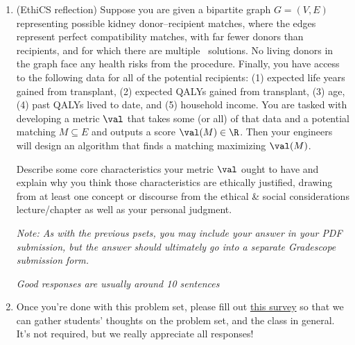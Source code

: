 \documentclass[11pt]{article}
\begin{document}
\begin{enumerate}
 \item (EthiCS reflection) Suppose you are given a bipartite graph $G=(V,E)$ representing possible kidney donor--recipient matches, where the edges represent perfect compatibility matches, with far fewer donors than recipients, and for which there are multiple \MaximumMatching\ solutions. No living donors in the graph face any health risks from the procedure. Finally, you have access to the following data for all of the potential recipients: (1) expected life years gained from transplant, (2) expected QALYs gained from transplant, (3) age, (4) past QALYs lived to date, and (5) household income. You are tasked with developing a metric $\val$ that takes some (or all) of that data
 and a potential matching $M\subseteq E$ and outputs a score $\val(M)\in \R$.
 Then your engineers will design an algorithm that finds a matching maximizing $\val(M)$.

 Describe some core characteristics your metric $\val$ ought to have and explain why you think those characteristics are ethically justified, drawing from at least one concept or discourse from the ethical \& social considerations lecture/chapter as well as your personal judgment.

 \textit{Note: As with the previous psets, you may include your answer in your PDF submission, but the answer should ultimately go into a separate Gradescope submission form.}
 
 \emph{Good responses are usually around 10 sentences}

\item Once you're done with this problem set, please fill out \href{https://forms.gle/qQp9CyLP9T4hMacMA}{this survey} so that we can gather students' thoughts on the problem set, and the class in general. It's not required, but we really appreciate all responses!

\end{enumerate}
\end{document}
